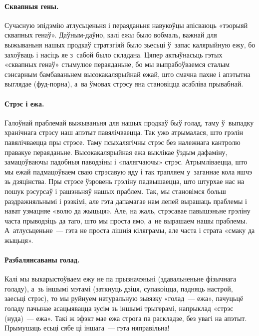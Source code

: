 \paragraph{Сквапныя гены.}
Сучасную эпідэмію атлусьценьня і пераяданьня навукоўцы апісваюць «тэорыяй сквапных генаў». Даўным-даўно, калі ежы было вобмаль, важнай для выжываньня нашых продкаў стратэгіяй было зьесьці ў~запас калярыйную ежу, бо захоўваць і насіць яе з~сабой было складана. Цяпер актыўнасьць гэтых «сквапных генаў» стымулюе пераяданьне, бо мы выпрабоўваемся сталым сэнсарным бамбаваньнем высокакалярыйнай ежай, што смачна пахне і апэтытна выглядае (фуд-порна), а~ва ўмовах стрэсу яна становіцца асабліва прывабнай.

\paragraph{Стрэс і ежа.}
Галоўнай праблемай выжываньня для нашых продкаў быў голад, таму ў~выпадку хранічнага стрэсу наш апэтыт павялічваецца. Так ужо атрымалася, што грэлін павялічваецца пры стрэсе. Таму псыхалягічны стрэс без належнага кантролю правакуе пераяданьне. Высокакалярыйная ежа выклікае ўздым дафаміну, замацоўваючы падобныя паводзіны і «палягчаючы» стрэс. Атрымліваецца, што мы ежай падмацоўваем сваю стрэсавую яду і так трапляем у~заганнае кола яшчэ зь дзяцінства. Пры стрэсе ўзровень грэліну падвышаецца, што штурхае нас на пошук рэсурсаў і рашэньняў нашых праблем. Так, мы становімся больш раздражняльнымі і рэзкімі, але гэта дапамагае нам лепей вырашаць праблемы і нават узмацняе «волю да жыцьця». Але, на жаль, стрэсавае павышэньне грэліну часта прыводзіць да таго, што мы проста ямо, а~не вырашаем нашы праблемы. А~атлусьценьне~--- гэта не проста лішнія кіляграмы, але часта і страта «смаку да жыцьця».

\paragraph{Разбалянсаваны голад.}
Калі мы выкарыстоўваем ежу не па прызначэньні (здавальненьне фізычнага голаду), а~зь іншымі мэтамі (заткнуць дзіця, супакоіцца, падняць настрой, заесьці стрэс), то мы руйнуем натуральную зьвязку «голад~--- ежа», пачуцьцё голаду пачынае асацыявацца зусім зь іншымі трыгерамі, напрыклад «стрэс (нуда)~--- ежа». Такі ж эфэкт мае ежа строга па раскладзе, без увагі на апэтыт. Прымушаць есьці сябе ці іншага~--- гэта няправільна!


